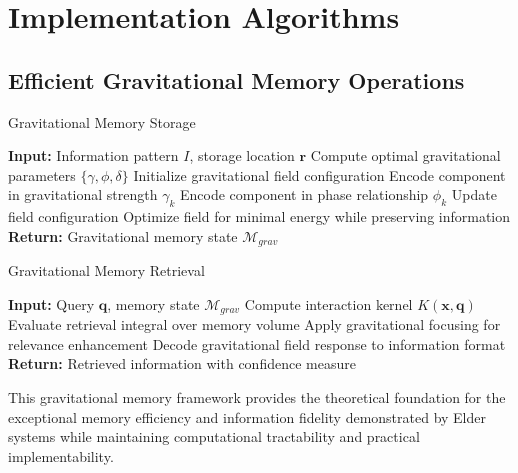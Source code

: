 \section{Implementation Algorithms}

\subsection{Efficient Gravitational Memory Operations}

\begin{algorithm}
\caption{Gravitational Memory Storage}
\begin{algorithmic}[1]
\State \textbf{Input:} Information pattern $I$, storage location $\mathbf{r}$
\State Compute optimal gravitational parameters $\{\gamma, \phi, \delta\}$
\State Initialize gravitational field configuration
    \State Encode component in gravitational strength $\gamma_k$
    \State Encode component in phase relationship $\phi_k$
    \State Update field configuration
\EndFor
\State Optimize field for minimal energy while preserving information
\State \textbf{Return:} Gravitational memory state $\mathcal{M}_{grav}$
\end{algorithmic}
\end{algorithm}

\begin{algorithm}
\caption{Gravitational Memory Retrieval}
\begin{algorithmic}[1]
\State \textbf{Input:} Query $\mathbf{q}$, memory state $\mathcal{M}_{grav}$
\State Compute interaction kernel $K(\mathbf{x}, \mathbf{q})$
\State Evaluate retrieval integral over memory volume
\State Apply gravitational focusing for relevance enhancement
\State Decode gravitational field response to information format
\State \textbf{Return:} Retrieved information with confidence measure
\end{algorithmic}
\end{algorithm}

This gravitational memory framework provides the theoretical foundation for the exceptional memory efficiency and information fidelity demonstrated by Elder systems while maintaining computational tractability and practical implementability.
